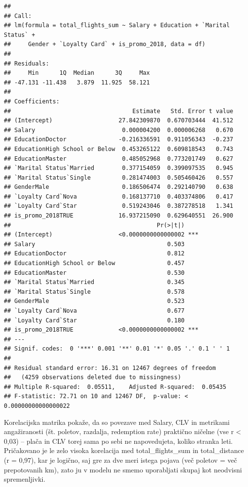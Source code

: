 \documentclass[
]{article}
\begin{document}
\begin{verbatim}
## 
## Call:
## lm(formula = total_flights_sum ~ Salary + Education + `Marital Status` + 
##     Gender + `Loyalty Card` + is_promo_2018, data = df)
## 
## Residuals:
##     Min      1Q  Median      3Q     Max 
## -47.131 -11.438   3.879  11.925  58.121 
## 
## Coefficients:
##                                   Estimate   Std. Error t value
## (Intercept)                   27.842309870  0.670703444  41.512
## Salary                         0.000004200  0.000006268   0.670
## EducationDoctor               -0.216336591  0.911056343  -0.237
## EducationHigh School or Below  0.453265122  0.609818543   0.743
## EducationMaster                0.485052968  0.773201749   0.627
## `Marital Status`Married        0.377154059  0.399097535   0.945
## `Marital Status`Single         0.281474003  0.505460426   0.557
## GenderMale                     0.186506474  0.292140790   0.638
## `Loyalty Card`Nova             0.168137710  0.403374806   0.417
## `Loyalty Card`Star             0.519243046  0.387278518   1.341
## is_promo_2018TRUE             16.937215090  0.629640551  26.900
##                                          Pr(>|t|)    
## (Intercept)                   <0.0000000000000002 ***
## Salary                                      0.503    
## EducationDoctor                             0.812    
## EducationHigh School or Below               0.457    
## EducationMaster                             0.530    
## `Marital Status`Married                     0.345    
## `Marital Status`Single                      0.578    
## GenderMale                                  0.523    
## `Loyalty Card`Nova                          0.677    
## `Loyalty Card`Star                          0.180    
## is_promo_2018TRUE             <0.0000000000000002 ***
## ---
## Signif. codes:  0 '***' 0.001 '**' 0.01 '*' 0.05 '.' 0.1 ' ' 1
## 
## Residual standard error: 16.31 on 12467 degrees of freedom
##   (4259 observations deleted due to missingness)
## Multiple R-squared:  0.05511,    Adjusted R-squared:  0.05435 
## F-statistic: 72.71 on 10 and 12467 DF,  p-value: < 0.00000000000000022
\end{verbatim}

Korelacijska matrika pokaže, da so povezave med Salary, CLV in metrikami
angažiranosti (št. poletov, razdalja, redemption rate) praktično ničelne
(vse \textbar r\textbar{} \textless{} 0,03) -- plača in CLV torej sama
po sebi ne napovedujeta, koliko stranka leti. Pričakovano je le zelo
visoka korelacija med total\_flights\_sum in total\_distance (r = 0,97),
kar je logično, saj gre za dve meri istega pojava (več poletov = več
prepotovanih km), zato ju v modelu ne smemo uporabljati skupaj kot
neodvisni spremenljivki.
\end{document}
